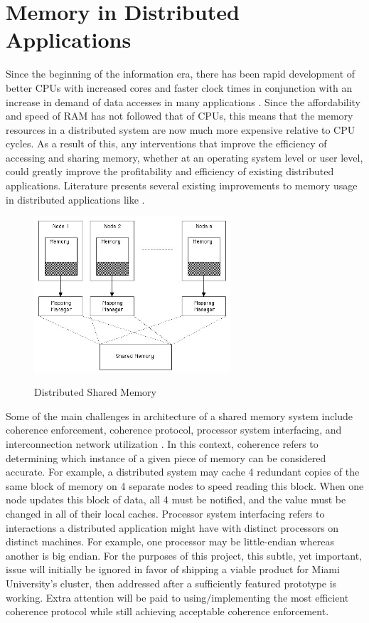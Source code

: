 \section{Memory in Distributed Applications} \label{memory_distrib}
Since the beginning of the information era, there has been rapid development of better CPUs with increased cores and faster clock times in conjunction with an increase in demand of data accesses in many applications \cite{sharing_cpu_memory}. Since the affordability and speed of RAM has not followed that of CPUs, this means that the memory resources in a distributed system are now much more expensive relative to CPU cycles. As a result of this, any interventions that improve the efficiency of accessing and sharing memory, whether at an operating system level or user level, could greatly improve the profitability and efficiency of existing distributed applications. Literature presents several existing improvements to memory usage in distributed applications like \cite{virtual_memory_tlb} \cite{sharing_cpu_memory}.

\begin{figure}[h]
	\centering
	\includegraphics[width=0.65\textwidth]{Figures/dsm.jpg}
	\label{fig:dsm}
	\caption{Distributed Shared Memory \cite{vt_cs}}
\end{figure}
Some of the main challenges in architecture of a shared memory system include coherence enforcement, coherence protocol, processor system interfacing, and interconnection network utilization \cite{challenge_dist_mem}. In this context, coherence refers to determining which instance of a given piece of memory can be considered accurate. For example, a distributed system may cache 4 redundant copies of the same block of memory on 4 separate nodes to speed reading this block. When one node updates this block of data, all 4 must be notified, and the value must be changed in all of their local caches. Processor system interfacing refers to interactions a distributed application might have with distinct processors on distinct machines. For example, one processor may be little-endian whereas another is big endian. For the purposes of this project, this subtle, yet important, issue will initially be ignored in favor of shipping a viable product for Miami University's cluster, then addressed after a sufficiently featured prototype is working. Extra attention will be paid to using/implementing the most efficient coherence protocol while still achieving acceptable coherence enforcement.  

